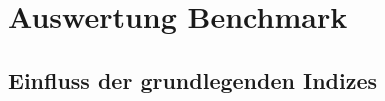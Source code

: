 \chapter{Auswertung Benchmark}

\section{Einfluss der grundlegenden Indizes}
\label{sec:basic_indizes}

